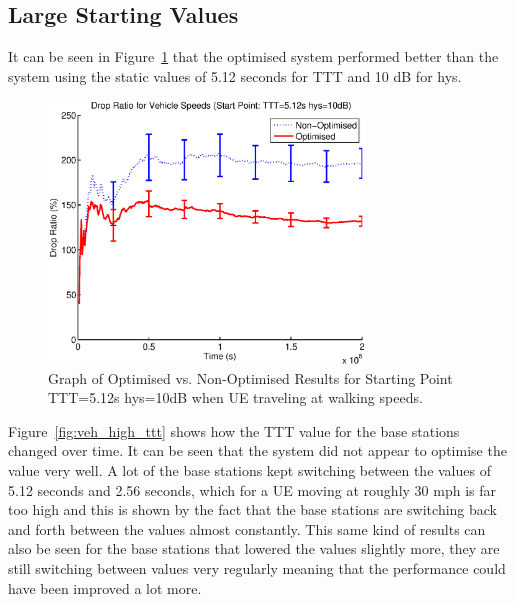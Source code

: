 \subsection{Large Starting Values}
It can be seen in Figure~\ref{fig:veh_high_drop} that the optimised system performed better than the system using the static values of 5.12 seconds for TTT and 10 dB for hys. 
\begin{figure}[H]
  \begin{center}
    	  \includegraphics[width=0.75\textwidth]{figures/vehicle_figures/vehhigh.eps}
    \end{center}
    \caption{Graph of Optimised vs. Non-Optimised Results for Starting Point TTT=5.12s hys=10dB when UE traveling at walking speeds.}
    \label{fig:veh_high_drop}
\end{figure}
Figure~\ref{fig:veh_high_ttt} shows how the TTT value for the base stations changed over time. It can be seen that the system did not appear to optimise the value very well. A lot of the base stations kept switching between the values of 5.12 seconds and 2.56 seconds, which for a UE moving at roughly 30 mph is far too high and this is shown by the fact that the base stations are switching back and forth between the values almost constantly. This same kind of results can also be seen for the base stations that lowered the values slightly more, they are still switching between values very regularly meaning that the performance could have been improved a lot more. 

